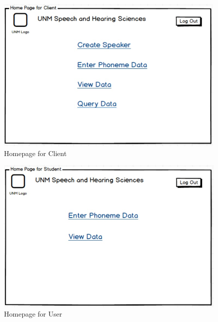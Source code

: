 \documentclass[12pt, a4paper, oneside]{article}
\begin{document}
\begin{figure}
\centering
\includegraphics[width=\textwidth,height=\textheight,keepaspectratio]{./images/Wireframes/Homepage.jpg}
\caption{Homepage for Client}
\end{figure}


\begin{figure}
\centering
\includegraphics[width=\textwidth,height=\textheight,keepaspectratio]{./images/Wireframes/Homepage1.jpg}
\caption{Homepage for User}
\end{figure}
\end{document}

